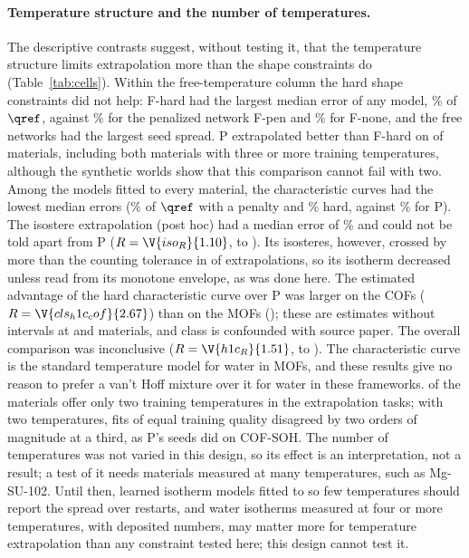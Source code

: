 \documentclass[journal=jcisd8,manuscript=article]{achemso}
\begin{document}
\paragraph{Temperature structure and the number of temperatures.} The descriptive contrasts suggest, without testing
it, that the temperature structure limits extrapolation more than the shape constraints do (Table~\ref{tab:cells}).
Within the free-temperature column the hard shape constraints did not help: F-hard had the largest median error of
any model, \% of $\qref$, against \% for the penalized network F-pen and
\% for F-none, and the free networks had the largest seed spread. P extrapolated better than
F-hard on  of  materials, including both materials with three or more training
temperatures, although the synthetic worlds show that this comparison cannot fail with two. Among the models fitted
to every material, the characteristic curves had the lowest median errors (\% of $\qref$ with a
penalty and \% hard, against \% for P). The isostere extrapolation (post hoc) had a median error of
\% and could not be told apart from P ($R = \V{iso_R}{1.10}$,  to ).
Its isosteres, however, crossed by more than the counting tolerance in  of 
extrapolations, so its isotherm decreased unless read from its monotone envelope, as was done here. The estimated advantage of the hard characteristic curve over P was
larger on the COFs ($R = \V{cls_h1c_cof}{2.67}$) than on the MOFs (); these are estimates without
intervals at  and  materials, and class is confounded with source paper. The overall comparison
was inconclusive ($R = \V{h1c_R}{1.51}$,  to ). The characteristic curve is the
standard temperature model for water in MOFs\cite{liu2020}, and these results give no reason to prefer a van't Hoff
mixture over it for water in these frameworks.  of the  materials offer only two
training temperatures in the extrapolation tasks; with two temperatures, fits of equal training quality disagreed by
two orders of magnitude at a third, as P's seeds did on COF-SOH. The number of temperatures was
not varied in this design, so its effect is an interpretation, not a result; a test of it needs materials measured at
many temperatures, such as Mg-SU-102. Until then, learned isotherm models fitted to so few temperatures should report
the spread over restarts, and water isotherms measured at four or more temperatures, with deposited numbers, may
matter more for temperature extrapolation than any constraint tested here; this design cannot test it.
\end{document}
